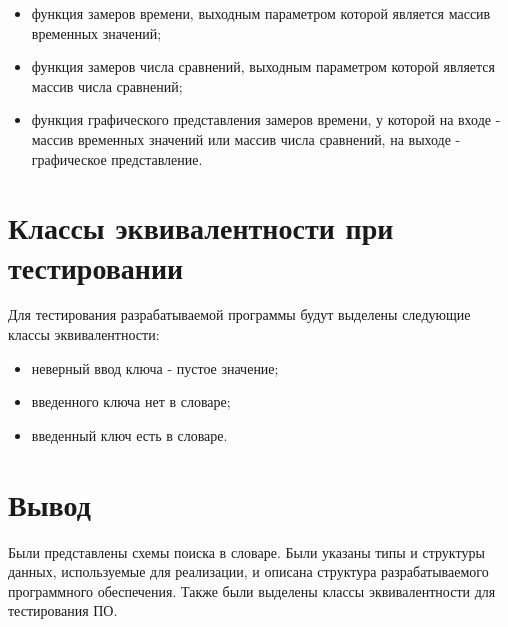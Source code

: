 \begin{itemize}
	\item функция замеров времени, выходным параметром которой является массив временных значений;
	\item функция замеров числа сравнений, выходным параметром которой является массив числа сравнений;
	\item функция графического представления замеров времени, у которой на входе - массив временных значений или массив числа сравнений, на выходе - графическое представление.
\end{itemize}

\section{Классы эквивалентности при тестировании}

Для тестирования разрабатываемой программы будут выделены следующие классы эквивалентности:

\begin{itemize}
	\item неверный ввод ключа - пустое значение;
	\item введенного ключа нет в словаре;
	\item введенный ключ есть в словаре.
\end{itemize}

\section{Вывод}

Были представлены схемы поиска в словаре. Были указаны типы и структуры данных, используемые для реализации, и описана структура разрабатываемого программного обеспечения. Также были выделены классы эквивалентности для тестирования ПО.
